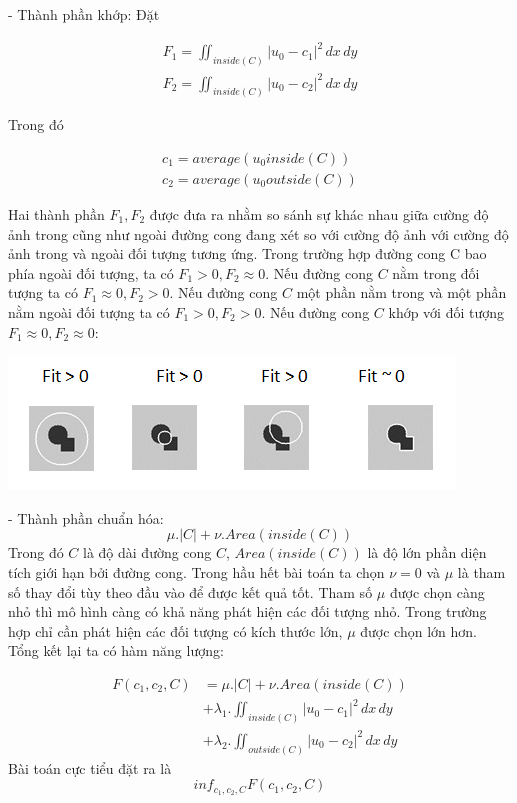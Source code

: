 \documentclass[14pt,oneside,a4paper]{extreport}
\begin{document}
- Thành phần khớp: Đặt

\begin{center}
\begin{align*}
F_1=\iint_{inside(C)} |u_0-c_1|^2 \,dx\,dy\\
F_2=\iint_{inside(C)} |u_0-c_2|^2 \,dx\,dy
\end{align*}
\end{center}
Trong đó
\begin{center}
\begin{align*}
c_1=average(u_0 inside(C))\\
c_2=average(u_0 outside(C))
\end{align*}
\end{center} 
Hai thành phần $F_1, F_2$ được đưa ra nhằm so sánh sự khác nhau giữa cường độ ảnh trong cũng như ngoài đường cong đang xét so với cường độ ảnh với cường độ ảnh trong và ngoài đối tượng tương ứng. Trong trường hợp đường cong C bao phía ngoài đối tượng, ta có $F_1>0, F_2\approx 0$. Nếu đường cong $C$ nằm trong đối tượng ta có $F_1 \approx0, F_2> 0$. Nếu đường cong $C$ một phần nằm trong và một phần nằm ngoài đối tượng ta có $F_1>0, F_2> 0$. Nếu đường cong $C$ khớp với đối tượng $F_1 \approx 0, F_2\approx 0$:
\begin{center}
\includegraphics[scale=1]{figure/fitting.png}
\end{center}
- Thành phần chuẩn hóa:
\begin{equation}
\mu .|C|+\nu .Area(inside(C))
\end{equation}
Trong đó $C$ là độ dài đường cong $C$, $Area(inside(C))$ là độ lớn phần diện tích giới hạn bởi đường cong. Trong hầu hết bài toán ta chọn $\nu=0$ và $\mu$ là tham số thay đổi tùy theo đầu vào để được kết quả tốt. Tham số $\mu $ được chọn càng nhỏ thì mô hình càng có khả năng phát hiện các đối tượng nhỏ. Trong trường hợp chỉ cần phát hiện các đối tượng có kích thước lớn, $\mu$ được chọn lớn hơn.\\

Tổng kết lại ta có hàm năng lượng: 

\begin{equation*}
\begin{split}
F(c_1, c_2, C)&=\mu .|C|+\nu .Area(inside(C)) \\ 
&+\lambda_1 .\iint_{inside(C)} |u_0-c_1|^2 \,dx\,dy\\
&+\lambda_2 .\iint_{outside(C)} |u_0-c_2|^2 \,dx\,dy
\end{split}
\end{equation*}
Bài toán cực tiểu đặt ra là
\begin{equation}
inf_{c_1,c_2,C} F(c_1, c_2, C)
\end{equation}
 
\end{document}
